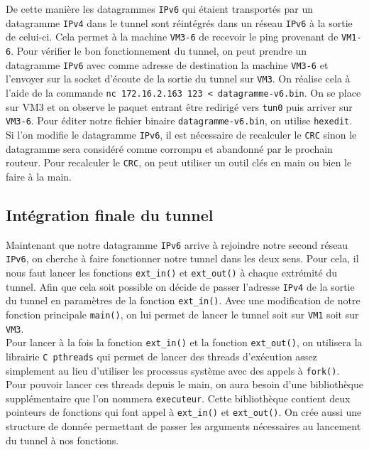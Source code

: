 \documentclass[a4paper, 12pt]{article}
\begin{document}
\begin{spacing}{1.1}
    De cette manière les datagrammes \verb+IPv6+ qui étaient transportés par un 
    datagramme \verb+IPv4+ dans le tunnel sont réintégrés dans un réseau 
    \verb+IPv6+ à la sortie de celui-ci. Cela permet à la machine \verb+VM3-6+ 
    de recevoir le ping provenant de \verb+VM1-6+. Pour vérifier le bon
    fonctionnement du tunnel, on peut prendre un datagramme \verb+IPv6+ avec
    comme adresse de destination la machine \verb+VM3-6+ et l'envoyer sur la
    socket d'écoute de la sortie du tunnel sur \verb+VM3+. On réalise cela à 
    l'aide de la commande \verb+nc 172.16.2.163 123 < datagramme-v6.bin+. On 
    se place sur VM3 et on observe le paquet entrant être redirigé vers 
    \verb+tun0+ puis arriver sur \verb+VM3-6+. Pour éditer notre fichier 
    binaire \verb+datagramme-v6.bin+, on utilise \verb+hexedit+. Si l'on 
    modifie le datagramme \verb+IPv6+, il est nécessaire de recalculer le 
    \verb+CRC+ sinon le datagramme sera considéré comme corrompu et abandonné
    par le prochain routeur. Pour recalculer le \verb+CRC+, on peut utiliser un 
    outil clés en main ou bien le faire à la main.

    \subsection{Intégration finale du tunnel}

    Maintenant que notre datagramme \verb+IPv6+ arrive à rejoindre notre second 
    réseau \verb+IPv6+, on cherche à faire fonctionner notre tunnel dans les 
    deux sens. Pour cela, il nous faut lancer les fonctions \verb+ext_in()+ et 
    \verb+ext_out()+ à chaque extrémité du tunnel. Afin que cela soit possible
    on décide de passer l'adresse \verb+IPv4+ de la sortie du tunnel en 
    paramètres de la fonction \verb+ext_in()+. Avec une modification de notre 
    fonction principale \verb+main()+, on lui permet de lancer le tunnel soit 
    sur \verb+VM1+ soit sur \verb+VM3+. \\

    Pour lancer à la fois la fonction \verb+ext_in()+ et la fonction 
    \verb+ext_out()+, on utilisera la librairie \verb+C pthreads+ qui permet 
    de lancer des threads d'exécution assez simplement au lieu d'utiliser les
    processus système avec des appels à \verb+fork()+. Pour pouvoir lancer ces
    threads depuis le main, on aura besoin d'une bibliothèque supplémentaire 
    que l'on nommera \verb+executeur+. Cette bibliothèque contient deux 
    pointeurs de fonctions qui font appel à \verb+ext_in()+ et \verb+ext_out()+.
    On crée aussi une structure de donnée permettant de passer les arguments
    nécessaires au lancement du tunnel à nos fonctions. \\


\end{spacing}
\end{document}
